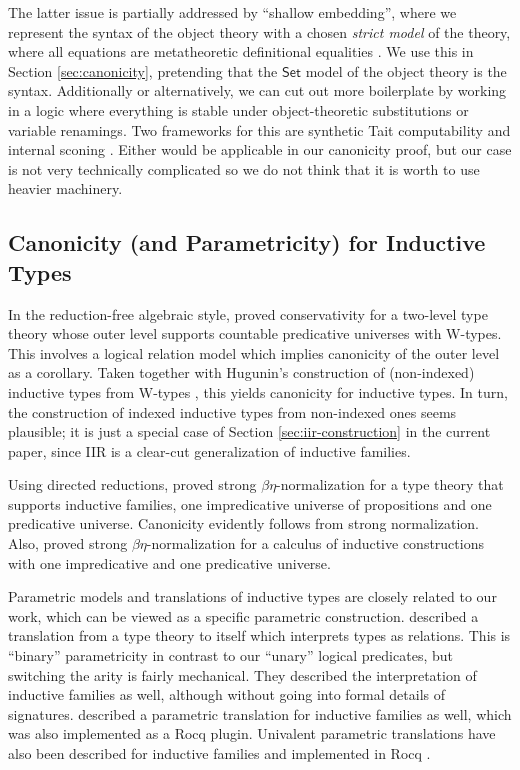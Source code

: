 \documentclass[acmsmall,screen,review,anonymous]{acmart}
\newcommand{\msf}[1]{{\mathsf{#1}}}
\newcommand{\Set}{\msf{Set}}
\begin{document}
The latter issue is partially addressed by ``shallow embedding'', where we represent the syntax of
the object theory with a chosen \emph{strict model} of the theory, where all equations are
metatheoretic definitional equalities \cite{DBLP:conf/mpc/KaposiKK19}. We use this in Section
\ref{sec:canonicity}, pretending that the $\Set$ model of the object theory is the
syntax. Additionally or alternatively, we can cut out more boilerplate by working in a logic where
everything is stable under object-theoretic substitutions or variable renamings. Two frameworks for
this are synthetic Tait computability \cite{sterlingthesis} and internal sconing
\cite{DBLP:conf/fscd/BocquetKS23}. Either would be applicable in our canonicity proof, but our case
is not very technically complicated so we do not think that it is worth to use heavier machinery.

\subsection{Canonicity (and Parametricity) for Inductive Types}

In the reduction-free algebraic style, \citet{DBLP:journals/pacmpl/Kovacs24} proved conservativity
for a two-level type theory whose outer level supports countable predicative universes with
W-types. This involves a logical relation model which implies canonicity of the outer level as a
corollary. Taken together with Hugunin's construction of (non-indexed) inductive types from W-types
\cite{whynotw}, this yields canonicity for inductive types. In turn, the construction of
indexed inductive types from non-indexed ones seems plausible; it is just a special case of
Section \ref{sec:iir-construction} in the current paper, since IIR is a clear-cut generalization
of inductive families.

Using directed reductions, \citet{DBLP:phd/ethos/Goguen94} proved strong $\beta\eta$-normalization
for a type theory that supports inductive families, one impredicative universe of propositions and one
predicative universe. Canonicity evidently follows from strong normalization. Also,
\cite{DBLP:phd/hal/Werner94} proved strong $\beta\eta$-normalization for a calculus of inductive
constructions with one impredicative and one predicative universe.

Parametric models and translations of inductive types are closely related to our work, which can be
viewed as a specific parametric construction. \citet{bernardy12parametricity} described a
translation from a type theory to itself which interprets types as relations. This is ``binary''
parametricity in contrast to our ``unary'' logical predicates, but switching the arity is fairly
mechanical. They described the interpretation of inductive families as well, although without going
into formal details of signatures. \citet{pedrot2018failure} described a parametric translation for
inductive families as well, which was also implemented as a Rocq plugin. Univalent parametric
translations have also been described for inductive families and implemented in Rocq
\cite{tabareau2018equivalences,tabareau2021marriage,cohen2024trocq}.
\end{document}
